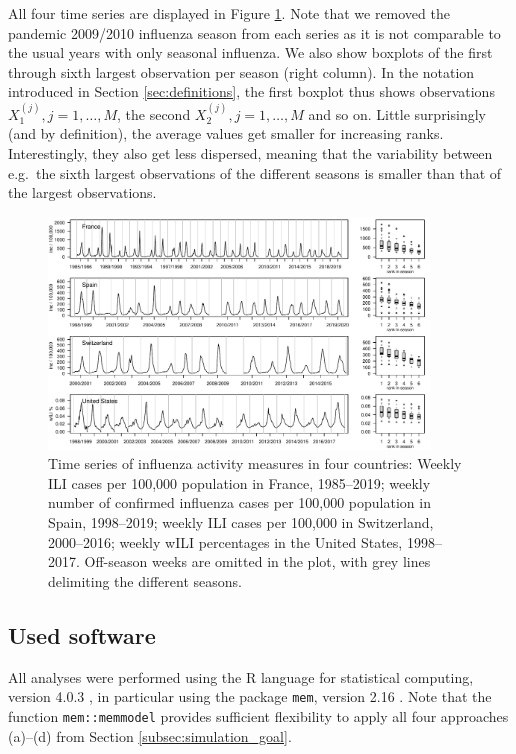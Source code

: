 \documentclass{article}
\begin{document}
All four time series are displayed in Figure \ref{fig:data}. Note that we removed the pandemic 2009/2010 influenza season from each series as it is not comparable to the usual years with only seasonal influenza. We also show boxplots of the first through sixth largest observation per season (right column). In the notation introduced in Section \ref{sec:definitions}, the first boxplot thus shows observations $X_1^{(j)}, j = 1, \dots, M$, the second $X_2^{(j)}, j = 1, \dots, M$ and so on. Little surprisingly (and by definition), the average values get smaller for increasing ranks. Interestingly, they also get less dispersed, meaning that the variability between e.g.\ the sixth largest observations of the different seasons is smaller than that of the largest observations. 


\begin{figure}[h]
\center
\includegraphics[width=0.9\textwidth]{figure/plot_data.pdf}
\caption{Time series of influenza activity measures in four countries: Weekly ILI cases per 100,000 population in France, 1985--2019; weekly number of confirmed influenza cases per 100,000 population in Spain, 1998--2019; weekly ILI cases per 100,000 in Switzerland, 2000--2016; weekly wILI percentages in the United States, 1998--2017. Off-season weeks are omitted in the plot, with grey lines delimiting the different seasons.}
\label{fig:data}
\end{figure}

\subsection{Used software}

All analyses were performed using the R language for statistical computing, version 4.0.3 \citep{RCT2020}, in particular using the package \texttt{mem}, version 2.16 \citep{Lozano2020}. Note that the function \texttt{mem::memmodel} provides sufficient flexibility to apply all four approaches (a)--(d) from Section \ref{subsec:simulation_goal}.
\end{document}
